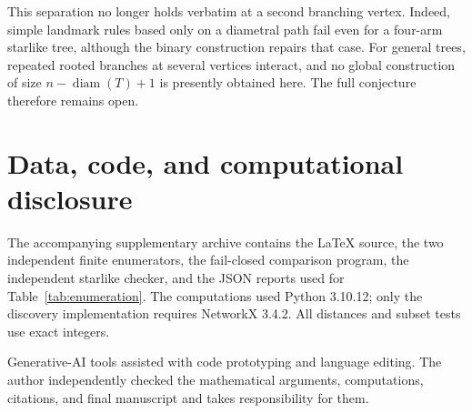 \documentclass[11pt]{amsart}
\theoremstyle{definition}
\newcommand{\diam}{\operatorname{diam}}
\begin{document}
This separation no longer holds verbatim at a second branching vertex.
Indeed, simple landmark rules based only on a diametral path fail even for a
four-arm starlike tree, although the binary construction repairs that case.
For general trees, repeated rooted branches at several vertices interact, and
no global construction of size \(n-\diam(T)+1\) is presently obtained here.
The full conjecture therefore remains open.

\section*{Data, code, and computational disclosure}

The accompanying supplementary archive contains the LaTeX source, the two
independent finite enumerators, the fail-closed comparison program, the
independent starlike checker, and the JSON reports used for
Table~\ref{tab:enumeration}.  The computations used Python 3.10.12; only the
discovery implementation requires NetworkX 3.4.2.  All distances and subset
tests use exact integers.

Generative-AI tools assisted with code prototyping and language editing.  The
author independently checked the mathematical arguments, computations,
citations, and final manuscript and takes responsibility for them.



\end{document}
